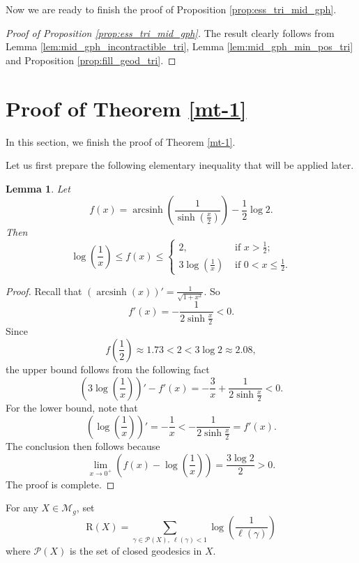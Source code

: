 \documentclass[UTF8]{amsart}
\newtheorem{lemma}[theorem]{Lemma}
\numberwithin{equation}{section}
\theoremstyle{definition}
\theoremstyle{example}
\theoremstyle{remark}
\DeclareMathOperator{\arcsinh}{arcsinh}
\newcommand{\sM}{\mathcal{M}}
\begin{document}
Now we are ready to finish the proof of Proposition \ref{prop:ess_tri_mid_gph}.
\begin{proof}[Proof of Proposition \ref{prop:ess_tri_mid_gph}]
The result clearly follows from Lemma \ref{lem:mid_gph_incontractible_tri}, Lemma \ref{lem:mid_gph_min_pos_tri} and Proposition \ref{prop:fill_geod_tri}.
\end{proof}


\section{Proof of Theorem \ref{mt-1}}\label{sec-t-1}
In this section, we finish the proof of Theorem \ref{mt-1}. 

Let us first prepare the following elementary inequality that will be applied later.
	\begin{lemma}
		Let 
		\[
		f(x) = \arcsinh \left( \frac{1}{\sinh \left( \frac{x}{2} \right) } \right) - \frac{1}{2}\log 2.
		\]
		Then 
		\[
			\log\left(\frac{1}{x}\right) \le f(x) \le 
		\begin{cases}
			2, &\text{ if } x > \frac{1}{2}  ;\\
			3\log\left(\frac{1}{x}\right)&\text{ if }0 < x \le \frac{1}{2}.
		\end{cases}
		\]
		\label{lem:dist}
	\end{lemma}
	\begin{proof}
		Recall that $(\arcsinh(x))' = \frac{1}{\sqrt{1+x^2}}$. So  
		\[
			f'(x) = - \frac{1}{2\sinh \frac{x}{2}} <0. 
		\]
Since 
\[f\left( \frac{1}{2} \right) \approx 1.73<2<3\log 2\approx 2.08,\]
the upper bound follows from the following fact $$\left(3\log\left(\frac{1}{x}\right)\right)'-f'(x)=-\frac{3}{x}+ \frac{1}{2\sinh \frac{x}{2}}<0.$$ 
For the lower bound, note that 
		\[
			\left(\log\left(\frac{1}{x}\right)\right)' = - \frac{1}{x} <  - \frac{1}{2\sinh \frac{x}{2}} =f'(x). 
		\]
		The conclusion then follows because
        \[\lim\limits_{x\to 0^+}\left(f(x)- \log\left(\frac{1}{x}\right)\right)=\frac{3\log 2}{2}>0.\] 
        The proof is complete.
	\end{proof}

For any $X\in \sM_g$, set
\begin{equation}
    \mathrm{R}(X) = \sum_{\gamma \in \mathcal{P}(X), \ \ell(\gamma) <1} \log \left(\frac{1}{\ell(\gamma)}\right)
\end{equation}
where $\mathcal{P}(X)$ is the set of closed geodesics in $X$.
\end{document}

